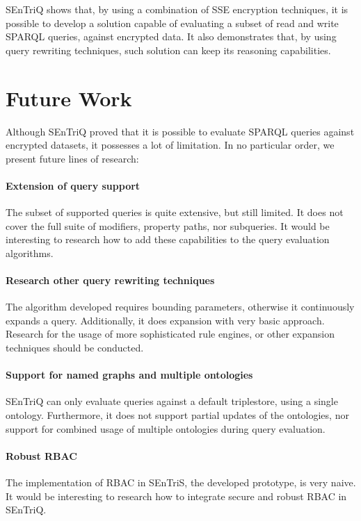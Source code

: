 \gls{SEnTriQ} shows that, by using a combination of \gls{SSE} encryption techniques, it is possible to develop a solution capable of evaluating a subset of read and write \gls{SPARQL} queries, against encrypted data. It also demonstrates that, by using query rewriting techniques, such solution can keep its reasoning capabilities.

\section{Future Work}
\label{sec:future-work}

Although \gls{SEnTriQ} proved that it is possible to evaluate \gls{SPARQL} queries against encrypted datasets, it possesses a lot of limitation. In no particular order, we present future lines of research:

\paragraph*{Extension of query support} The subset of supported queries is quite extensive, but still limited. It does not cover the full suite of modifiers, property paths, nor subqueries. It would be interesting to research how to add these capabilities to the query evaluation algorithms.

\paragraph*{Research other query rewriting techniques} The algorithm developed requires bounding parameters, otherwise it continuously expands a query. Additionally, it does expansion with very basic approach. Research for the usage of more sophisticated rule engines, or other expansion techniques should be conducted.

\paragraph*{Support for named graphs and multiple ontologies} \gls{SEnTriQ} can only evaluate queries against a default triplestore, using a single ontology. Furthermore, it does not support partial updates of the ontologies, nor support for combined usage of multiple ontologies during query evaluation.

\paragraph*{Robust \gls{RBAC}} The implementation of \gls{RBAC} in \gls{SEnTriS}, the developed prototype, is very naive. It would be interesting to research how to integrate secure and robust \gls{RBAC} in \gls{SEnTriQ}.

